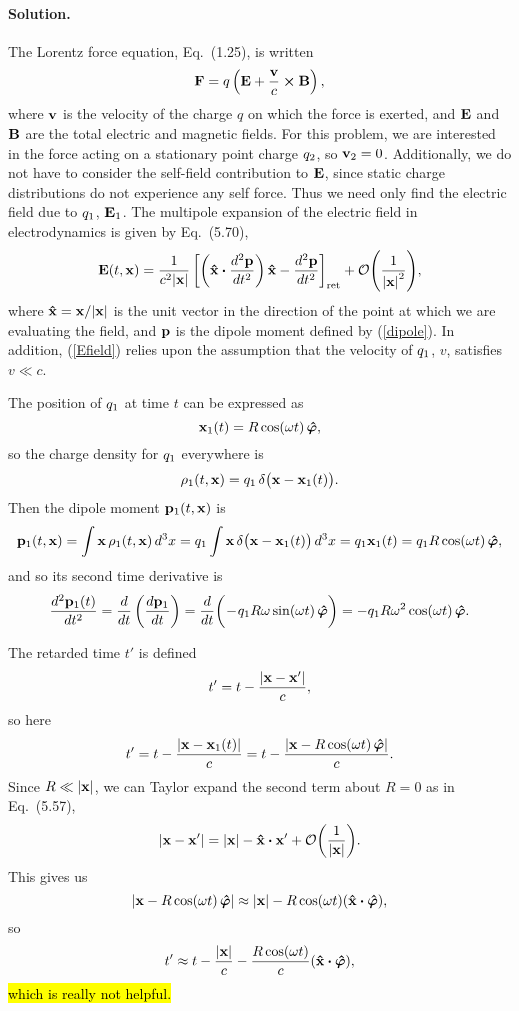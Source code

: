 \documentclass[11pt]{article}
\newcommand{\refeq}[1]{(\ref{#1})}
\newcommand{\beq}{\begin{equation*}}
\newcommand{\eeq}{\end{equation*}}
\newcommand{\beqn}{\begin{equation}}
\newcommand{\eeqn}{\end{equation}}
\newenvironment{solution}
{
    \paragraph{Solution.}
    \ignorespaces
}
{
    \bigskip
}
\begin{document}
\begin{solution}
	The Lorentz force equation, Eq.~(1.25), is written
	\beq
		\vF = q \left( \vE + \frac{\vv}{c} \cross \vB \right),
	\eeq
	where $\vb{v}$ is the velocity of the charge $q$ on which the force is exerted, and $\vb{E}$ and $\vb{B}$ are the total electric and magnetic fields.  For this problem, we are interested in the force acting on a stationary point charge $q_2$, so $\vb{v}_2 = 0$.  Additionally, we do not have to consider the self-field contribution to $\vb{E}$, since static charge distributions do not experience any self force.  Thus we need only find the electric field due to $q_1$, $\vb{E}_1$.  The multipole expansion of the electric field in electrodynamics is given by Eq.~(5.70),
	\beqn \label{Efield}
		\vE\tx = \frac{1}{c^2 \absx} \left[ \left(\xh \vdot \dv[2]{\vp}{t} \right) \xh - \dv[2]{\vp}{t} \right]_\ret + \order{\frac{1}{\absx^2}},
	\eeqn
	where $\vb{\hat{x}} = \vb{x} / \abs{\vb{x}}$ is the unit vector in the direction of the point at which we are evaluating the field, and $\vb{p}$ is the dipole moment defined by \refeq{dipole}.  In addition, \refeq{Efield} relies upon the assumption that the velocity of $q_1$, $v$, satisfies $v \ll c$.
	
	The position of $q_1$ at time $t$ can be expressed as
	\beq
		\vxqt = R \cos(\omg t) \,\phh,
	\eeq
	so the charge density for $q_1$ everywhere is
	\beq
		\rhoq\tx = \qq \,\del\big( \vx - \vxqt \big).
	\eeq
	Then the dipole moment $\vb{p}_1(t, \vb{x})$ is
	\beq
		\vpq\tx = \int \vx \,\rhoq\tx \dcx
		= \qq \int \vx \,\del\big(\vx - \vxqt \big) \dcx
		= \qq \vxqt
		= \qq R \cos(\omg t) \,\phh,
	\eeq
	and so its second time derivative is
	\beq
		\dv[2]{\vpqt}{t} = \dv{}{t} \left( \dv{\vpq}{t} \right)
		= \dv{}{t} \bigg( \!-\!\qq R \omg \sin(\omg t) \,\phh \bigg)
		= -\qq R \omg^2 \cos(\omg t) \,\phh.
	\eeq
	
	The retarded time $t'$ is defined
	\beq
		t' = t - \frac{\abs{\vx - \vx'}}{c},
	\eeq
	so here
	\beq
		t' = t - \frac{\abs{\vx - \vxqt}}{c}
		= t - \frac{\abs{\vx - R \cos(\omg t) \,\phh}}{c}.
	\eeq
	Since $R \ll \abs{\vb{x}}$, we can Taylor expand the second term about $R = 0$ as in Eq.~(5.57),
	\beq
		\abs{\vx - \vx'} = \absx - \xh \vdot \vx' + \order{\frac{1}{\absx}}.
	\eeq
	This gives us
	\beq
		\abs{\vx - R \cos(\omg t) \,\phh} \approx \absx - R \cos(\omg t) (\xh \vdot \phh),
	\eeq
	so
	\beq
		t' \approx t - \frac{\absx}{c} - \frac{R \cos(\omg t)}{c} (\xh \vdot \phh),
	\eeq
	\hl{which is really not helpful.}
\end{solution}
\end{document}
